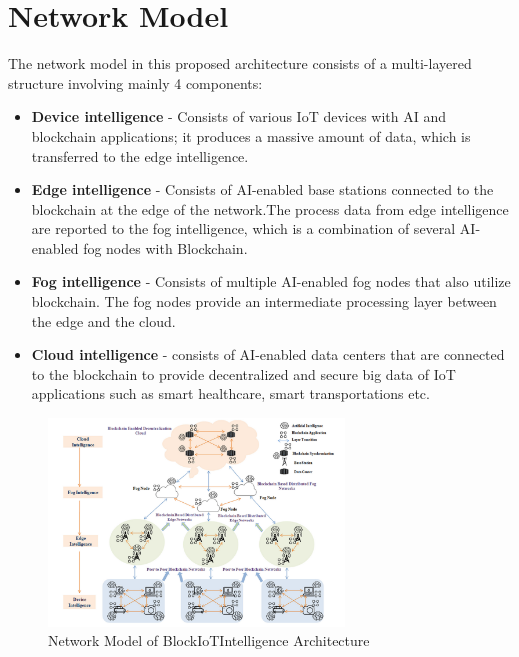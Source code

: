 \documentclass[12pt, oneside]{report}
\begin{document}
\section{Network Model}
The network model in this proposed architecture consists of a multi-layered structure involving mainly 4 components: 

\begin{itemize}
    \item \textbf{Device intelligence} - Consists of various IoT devices with AI and blockchain applications; it produces a massive amount of data, which is transferred to the edge intelligence.
    \item \textbf{Edge intelligence} - Consists of AI-enabled base stations connected to the blockchain at the edge of the network.The process data from edge intelligence are reported to the fog intelligence, which is a combination of several AI-enabled fog nodes with Blockchain.
    \item \textbf{Fog intelligence} - Consists of multiple AI-enabled fog nodes that also utilize blockchain. The fog nodes provide an intermediate processing layer between the edge and the cloud.
    \item \textbf{Cloud intelligence} - consists of AI-enabled data centers that are connected to the blockchain to provide decentralized and secure big data of IoT applications such as smart healthcare, smart transportations etc.
\end{itemize} 
\begin{figure}[H] %
    \centering
    \includegraphics[width=0.7\textwidth]{BlockChainIOT.png} %
    \caption{Network Model of BlockIoTIntelligence Architecture} %
    \label{fig:network_model} %
\end{figure}
\end{document}
